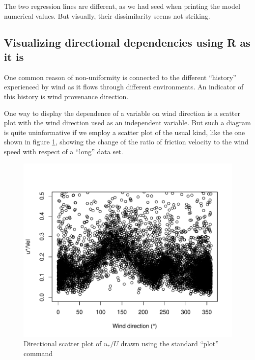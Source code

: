 \documentclass[a4paper,10pt]{book}
\begin{document}
The two regression lines are different, as we had seed when printing the model numerical values. But visually, their dissimilarity seems not striking.

\subsection{Visualizing directional dependencies using R as it is}

One common reason of non-uniformity is connected to the different ``history'' experienced by wind as it flows through different environments. An indicator of this history is wind provenance direction.

One way to display the dependence of a variable on wind direction is a scatter plot with the wind direction used as an independent variable. But such a diagram is quite uninformative if we employ a scatter plot of the usual kind, like the one shown in figure \ref{fig:Normal directional scatter plot}, showing the change of the ratio of friction velocity to the wind speed with respect of a ``long'' data set.

\begin{figure}[htp]
 \centering
 \begin{center}
 \includegraphics[scale=1,keepaspectratio=true]{./diagrams/UstarOverVel_vs_Dir_Standard.pdf}
 \end{center}
 \caption{Directional scatter plot of $u_{*}/U$ drawn using the standard ``plot'' command}
 \label{fig:Normal directional scatter plot}
\end{figure}
\end{document}
